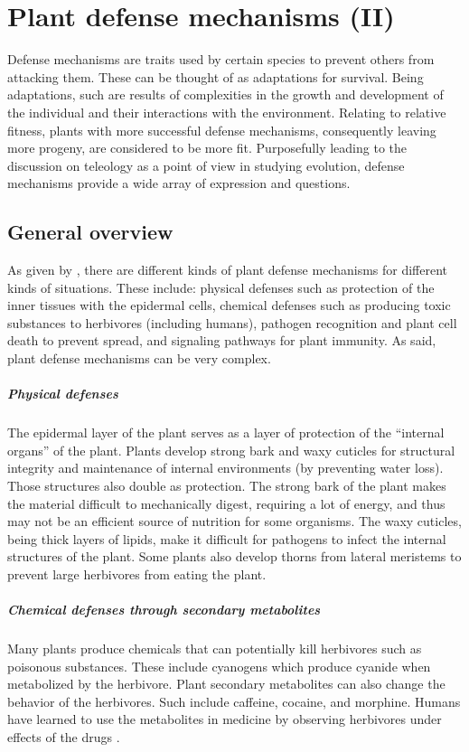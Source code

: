 \chapter{Plant defense mechanisms (II)}

Defense mechanisms are traits used by certain species to prevent others from attacking them.
These can be thought of as adaptations for survival.
Being adaptations, such are results of complexities in the growth and development of the individual and their interactions with the environment.
Relating to relative fitness, plants with more successful defense mechanisms, consequently leaving more progeny, are considered to be more fit. %
Purposefully leading to the discussion on teleology as a point of view in studying evolution, defense mechanisms provide a wide array of expression and questions.

\section{General overview}
As given by , there are different kinds of plant defense mechanisms for different kinds of situations.
These include: physical defenses such as protection of the inner tissues with the epidermal cells,
chemical defenses such as producing toxic substances to herbivores (including humans),
pathogen recognition and plant cell death to prevent spread, and
signaling pathways for plant immunity.
As said, plant defense mechanisms can be very complex.

\paragraph{Physical defenses}
The epidermal layer of the plant serves as a layer of protection of the ``internal organs'' of the plant.
Plants develop strong bark and waxy cuticles for structural integrity and maintenance of internal environments (by preventing water loss).
Those structures also double as protection.
The strong bark of the plant makes the material difficult to mechanically digest, requiring a lot of energy, and thus may not be an efficient source of nutrition for some organisms.
The waxy cuticles, being thick layers of lipids, make it difficult for pathogens to infect the internal structures of the plant.
Some plants also develop thorns from lateral meristems to prevent large herbivores from eating the plant.

\paragraph{Chemical defenses through secondary metabolites}
Many plants produce chemicals that can potentially kill herbivores such as poisonous substances.
These include cyanogens which produce cyanide when metabolized by the herbivore.
Plant secondary metabolites can also change the behavior of the herbivores.
Such include caffeine, cocaine, and morphine.
Humans have learned to use the metabolites in medicine by observing herbivores under effects of the drugs \cite[p.794-796]{biomain}.

